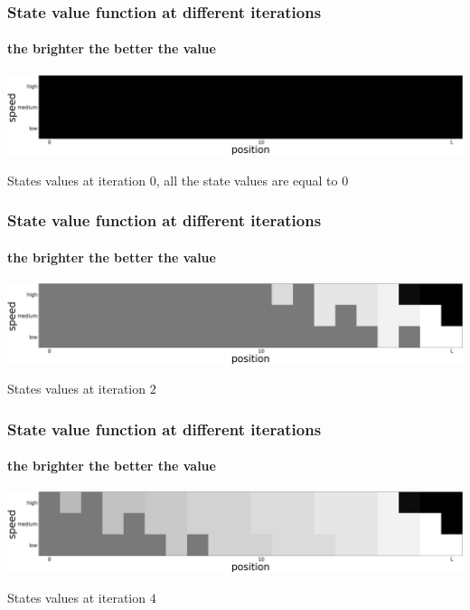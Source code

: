 \documentclass[dvipsnames,svgnames]{beamer}
\begin{document}
\begin{frame}
\frametitle{State value function at different iterations}
\framesubtitle{the brighter the better the value}

\centering
\includegraphics[scale=0.12]{img/value0.jpg}\\
\begin{block}{}
\centering
States values at iteration $0$, all the state values are equal to $0$
\end{block}

\end{frame}




\begin{frame}
\frametitle{State value function at different iterations}
\framesubtitle{the brighter the better the value}
\centering
\includegraphics[scale=0.12]{img/value2.jpg}\\
\begin{block}{}
\centering
States values at iteration $2$ 
\end{block}
\end{frame}


\begin{frame}
\frametitle{State value function at different iterations}
\framesubtitle{the brighter the better the value}

\centering
\includegraphics[scale=0.12]{img/value4.jpg}\\
\begin{block}{}
\centering
States values at iteration $4$ 
\end{block}
\end{frame}
\end{document}
